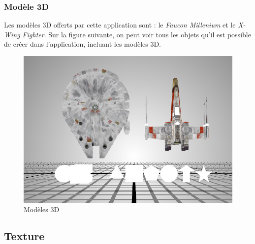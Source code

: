 \subsubsection{Modèle 3D}
Les modèles 3D offerts par cette application sont : le \textit{Faucon Millenium} et le \textit{X-Wing Fighter}.
Sur la figure suivante, on peut voir tous les objets qu'il est possible de créer dans l'application, incluant les modèles 3D.
\begin{figure}[H]
    \centering
	\includegraphics[scale=0.8]{fig/shapes.PNG}
	\caption{Modèles 3D}
	\label{fig:modeles3D}
\end{figure}

\subsection{Texture}
